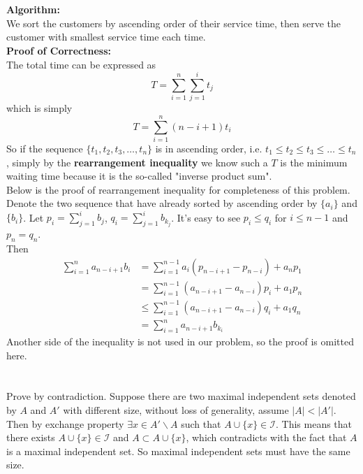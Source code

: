 \documentclass[12pt,letterpaper]{article}
\begin{document}
\section{}
\textbf{Algorithm:}\\
We sort the customers by ascending order of their service time,
then serve the customer with smallest service time each time.\\
\textbf{Proof of Correctness:}\\
The total time can be expressed as 
$$T=\sum_{i=1}^{n}\sum_{j=1}^{i}t_j$$
which is simply
$$T=\sum_{i=1}^{n}(n-i+1)t_i$$
So if the sequence $\{t_1,t_2,t_3,\dots,t_n\}$ is in ascending order, i.e.
$t_1\leq t_2\leq t_3\leq\dots\leq t_n$,
simply by the \textbf{rearrangement inequality} we know such a $T$ is the minimum waiting time
because it is the so-called "inverse product sum".\\
\newline
Below is the proof of rearrangement inequality for completeness of this problem.\\
Denote the two sequence that have already sorted by ascending order by $\{a_i\}$ and $\{b_i\}$.
Let $p_i=\sum_{j=1}^{i}b_j$, $q_i=\sum_{j=1}^{i}b_{k_j}$. It's easy to see $p_i\leq q_i$ for $i\leq n-1$ and $p_n=q_n$.\\
Then 
\begin{align}
    \sum_{i=1}^{n}a_{n-i+1}b_{i}&=\sum_{i=1}^{n-1}a_{i}(p_{n-i+1}-p_{n-i})+a_np_1\\
    &=\sum_{i=1}^{n-1}(a_{n-i+1}-a_{n-i})p_i+a_1p_n\\
    &\leq \sum_{i=1}^{n-1}(a_{n-i+1}-a_{n-i})q_i+a_1q_n\\
    &=\sum_{i=1}^{n}a_{n-i+1}b_{k_i}
\end{align}
Another side of the inequality is not used in our problem, 
so the proof is omitted here.

\newpage
\section{}
\subsection{}
Prove by contradiction. Suppose there are two maximal independent sets denoted by $A$ and $A'$ with different size,
without loss of generality, assume $|A|<|A'|$.
Then by exchange property $\exists x\in A'\backslash A$ such that $A\cup\{x\}\in\mathcal{I}$.
This means that there exists $A\cup\{x\}\in\mathcal{I}$ and $A\subset A\cup\{x\}$,
which contradicts with the fact that $A$ is a maximal independent set.
So maximal independent sets must have the same size.
\end{document}
